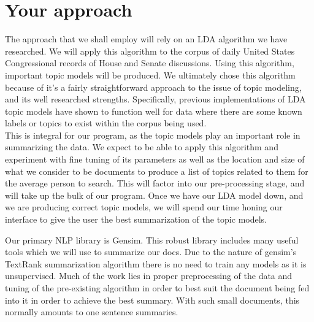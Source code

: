 \documentclass[11pt,a4paper]{article}
\begin{document}
\section{Your approach}
The approach that we shall employ will rely on an LDA algorithm we have researched. We will apply this algorithm to the corpus of daily United States Congressional records of House and Senate discussions. Using this algorithm, important topic models will be produced. We ultimately chose this algorithm because of it's a fairly straightforward approach to the issue of topic modeling, and its well researched strengths. Specifically, previous implementations of LDA topic models have shown to function well for data where there are some known labels or topics to exist within the corpus being used. \\
This is integral for our program, as the topic models play an important role in summarizing the data. We expect to be able to apply this algorithm and experiment with fine tuning of its parameters as well as the location and size of what we consider to be documents to produce a list of topics related to them for the average person to search. This will factor into our pre-processing stage, and will take up the bulk of our program. Once we have our LDA model down, and we are producing correct topic models, we will spend our time honing our interface to give the user the best summarization of the topic models. 

Our primary NLP library is Gensim. This robust library includes many useful tools which we will use to summarize our docs. Due to the nature of gensim’s TextRank summarization algorithm there is no need to train any models as it is unsupervised. Much of the work lies in proper preprocessing of the data and tuning of the pre-existing algorithm in order to best suit the document being fed into it in order to achieve the best summary. With such small documents, this normally amounts to one sentence summaries. 
\end{document}

